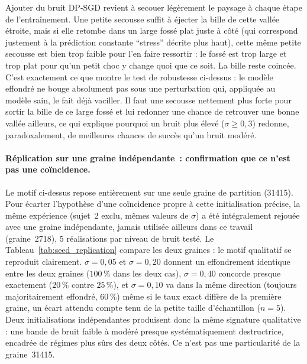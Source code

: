 \documentclass{acmart}
\begin{document}
Ajouter du bruit DP-SGD revient à secouer légèrement le paysage à chaque
étape de l'entraînement. Une petite secousse suffit à éjecter la bille de
cette vallée étroite, mais si elle retombe dans un large fossé plat juste
à côté (qui correspond justement à la prédiction constante ``stress''
décrite plus haut), cette même petite secousse est bien trop faible pour
l'en faire ressortir : le fossé est trop large et trop plat pour qu'un
petit choc y change quoi que ce soit. La bille reste coincée. C'est
exactement ce que montre le test de robustesse ci-dessus : le modèle
effondré ne bouge absolument pas sous une perturbation qui, appliquée au
modèle sain, le fait déjà vaciller. Il faut une secousse nettement plus
forte pour sortir la bille de ce large fossé et lui redonner une chance de
retrouver une bonne vallée ailleurs, ce qui explique pourquoi un bruit
plus élevé ($\sigma \geq 0{,}3$) redonne, paradoxalement, de meilleures
chances de succès qu'un bruit modéré.

\paragraph{Réplication sur une graine indépendante~: confirmation que ce
n'est pas une coïncidence.} Le motif ci-dessus repose entièrement sur une
seule graine de partition (31415). Pour écarter l'hypothèse d'une
coïncidence propre à cette initialisation précise, la même expérience
(sujet~2 exclu, mêmes valeurs de $\sigma$) a été intégralement rejouée
avec une graine indépendante, jamais utilisée ailleurs dans ce travail
(graine~2718), 5 réalisations par niveau de bruit testé. Le
Tableau~\ref{tab:seed_replication} compare les deux graines : le motif
qualitatif se reproduit clairement. $\sigma=0{,}05$ et $\sigma=0{,}20$
donnent un effondrement identique entre les deux graines ($100\,\%$ dans
les deux cas), $\sigma=0{,}40$ concorde presque exactement ($20\,\%$
contre $25\,\%$), et $\sigma=0{,}10$ va dans la même direction (toujours
majoritairement effondré, $60\,\%$) même si le taux exact diffère de la
première graine, un écart attendu compte tenu de la petite taille
d'échantillon ($n=5$). Deux initialisations indépendantes produisent donc
la même signature qualitative : une bande de bruit faible à modéré
presque systématiquement destructrice, encadrée de régimes plus sûrs des
deux côtés. Ce n'est pas une particularité de la graine~31415.
\end{document}
